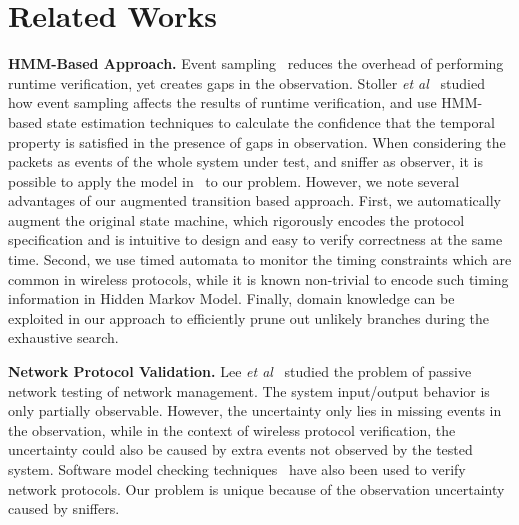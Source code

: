 \section{Related Works}
\label{sec:related}

\textbf{HMM-Based Approach.} Event
sampling~\cite{bonakdarpour2011sampling,hauswirth2004low,arnold2008qvm,fei2006artemis}
reduces the overhead of performing runtime verification, yet creates gaps in the
observation. Stoller \textit{et al}~\cite{stoller2011runtime} studied how event
sampling affects the results of runtime verification, and use HMM-based state
estimation techniques to calculate the confidence that the temporal property is
satisfied in the presence of gaps in observation. When considering the packets
as events of the whole system under test, and sniffer as observer, it is
possible to apply the model in~\cite{stoller2011runtime} to our problem.
However, we note several advantages of our augmented transition based approach.
First, we automatically augment the original state machine, which rigorously
encodes the protocol specification and is intuitive to design and easy to verify
correctness at the same time. Second, we use timed automata to monitor the
timing constraints which are common in wireless protocols, while it is known
non-trivial to encode such timing information in Hidden Markov Model. Finally,
domain knowledge can be exploited in our approach to efficiently prune out
unlikely branches during the exhaustive search.

\textbf{Network Protocol Validation.} Lee \textit{et al}~\cite{lee1997passive}
studied the problem of passive network testing of network management. The system
input/output behavior is only partially observable. However, the uncertainty
only lies in missing events in the observation, while in the context of wireless
protocol verification, the uncertainty could also be caused by extra events not
observed by the tested system. Software model checking
techniques~\cite{musuvathi2002cmc,godefroid1997model} have also been used to
verify network protocols. Our problem is unique because of the observation
uncertainty caused by sniffers.

